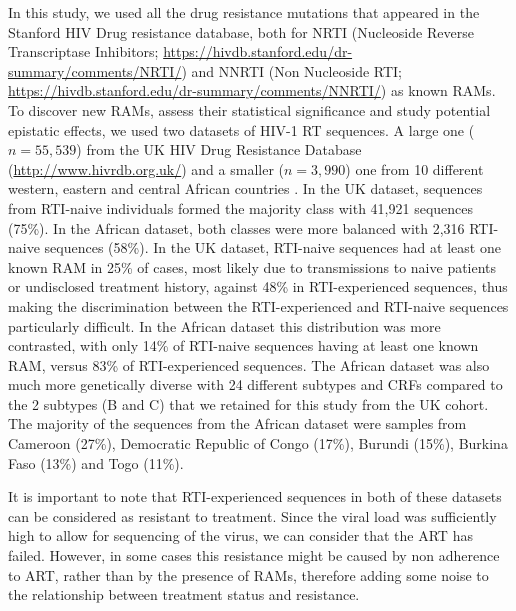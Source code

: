 \documentclass[
  11pt,
  twoside,
  BCOR=10mm,
  listof=totoc]{scrbook}
\begin{document}
In this study, we used all the drug resistance mutations that appeared
in the Stanford HIV Drug resistance database, both for NRTI (Nucleoside
Reverse Transcriptase Inhibitors;
\url{https://hivdb.stanford.edu/dr-summary/comments/NRTI/}) and NNRTI (Non
Nucleoside RTI; \url{https://hivdb.stanford.edu/dr-summary/comments/NNRTI/})
as known RAMs. To discover new RAMs, assess their statistical
significance and study potential epistatic effects, we used two datasets
of HIV-1 RT sequences. A large one (\(n=55,539\)) from the UK HIV Drug
Resistance Database (\url{http://www.hivrdb.org.uk/}) and a smaller
(\(n=3,990\)) one from 10 different western, eastern and central African
countries \autocite{villabona-arenasIndepthAnalysisHIV12016}. In the UK dataset,
sequences from RTI-naive individuals formed the majority class with
41,921 sequences (75\%). In the African dataset, both classes were more
balanced with 2,316 RTI-naive sequences (58\%). In the UK dataset,
RTI-naive sequences had at least one known RAM in 25\% of cases, most
likely due to transmissions to naive patients or undisclosed treatment
history, against 48\% in RTI-experienced sequences, thus making the
discrimination between the RTI-experienced and RTI-naive sequences
particularly difficult. In the African dataset this distribution was
more contrasted, with only 14\% of RTI-naive sequences having at least
one known RAM, versus 83\% of RTI-experienced sequences. The African
dataset was also much more genetically diverse with 24 different
subtypes and CRFs compared to the 2 subtypes (B and C) that we retained
for this study from the UK cohort. The majority of the sequences from
the African dataset were samples from Cameroon (27\%), Democratic
Republic of Congo (17\%), Burundi (15\%), Burkina Faso (13\%) and Togo
(11\%).

It is important to note that RTI-experienced sequences in both of these
datasets can be considered as resistant to treatment. Since the viral
load was sufficiently high to allow for sequencing of the virus, we can
consider that the ART has failed. However, in some cases this resistance
might be caused by non adherence to ART, rather than by the presence of
RAMs, therefore adding some noise to the relationship between treatment
status and resistance.
\end{document}
